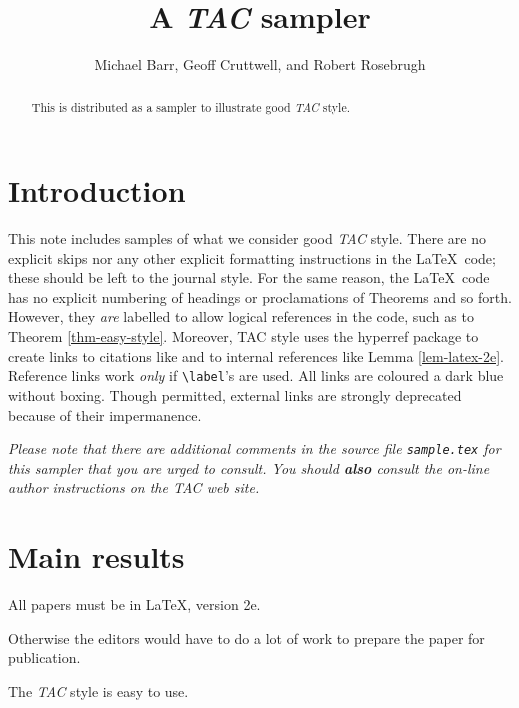\documentclass{tac}
\author{Michael Barr, Geoff Cruttwell, and Robert Rosebrugh}
\title{A \textsl{TAC} sampler}
\newtheorem{lem}{Lemma}
\let\pf\proof
\let\epf\endproof
\begin{document}
\maketitle
\begin{abstract}
 This is distributed as a sampler to illustrate good \textsl{TAC} style.
\end{abstract}


\section{Introduction}\label{sec-Introduction}

This note includes samples of what we consider good \textsl{TAC} style.  
There are no explicit skips nor any other explicit formatting
instructions in the \LaTeX\ code; these should be left to the journal style.  For the same
reason, the \LaTeX\ code has no explicit numbering of headings or proclamations of
Theorems and so forth. However, they \emph{are} labelled to allow
logical references in the code, such as to Theorem \ref{thm-easy-style}. 
Moreover, TAC style uses the hyperref package to create links to citations like 
\cite{LUG} and to internal references like Lemma \ref{lem-latex-2e}. 
Reference links work \emph{only} if \verb.\label.'s are used. All links are coloured a dark blue without boxing. 
Though permitted, external links are strongly deprecated because of their impermanence.

\emph{Please note that there are additional comments in the source file \texttt{sample.tex}
for this sampler that you are urged to consult. You should \textbf{also} consult
the on-line author instructions on the {\sl TAC} web site.}

\section{Main results}\label{sec-Main-results}


\lem\label{lem-latex-2e} All papers must be in \LaTeX, version 2e.\endlem

\pf Otherwise the editors would have to do a lot of work to prepare the
paper for publication.
\epf


\thm\label{thm-easy-style} The {\sl TAC} style is easy to use.\endthm
\end{document}
